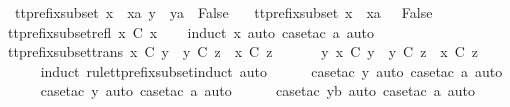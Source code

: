 \ \ {\isachardoublequoteopen}tt{\isacharunderscore}prefix{\isacharunderscore}subset\ {\isacharparenleft}x\ {\isacharhash}\ xa{\isacharparenright}\ {\isacharparenleft}y\ {\isacharhash}\ ya{\isacharparenright}\ {\isacharequal}\ False{\isachardoublequoteclose}\ {\isacharbar}\isanewline
\ \ {\isachardoublequoteopen}tt{\isacharunderscore}prefix{\isacharunderscore}subset\ {\isacharparenleft}x\ {\isacharhash}\ xa{\isacharparenright}\ {\isacharbrackleft}{\isacharbrackright}\ {\isacharequal}\ False{\isachardoublequoteclose}\isanewline
\isanewline
{}\isamarkupfalse%
\ tt{\isacharunderscore}prefix{\isacharunderscore}subset{\isacharunderscore}refl{\isacharcolon}\ {\isachardoublequoteopen}x\ {\isasymlesssim}\isactrlsub C\ x{\isachardoublequoteclose}\isanewline
%
\isadelimproof
\ \ %
\endisadelimproof
%
\isatagproof
{}\isamarkupfalse%
\ {\isacharparenleft}induct\ x{\isacharcomma}\ auto{\isacharcomma}\ case{\isacharunderscore}tac\ a{\isacharcomma}\ auto{\isacharparenright}%
\endisatagproof
{\isafoldproof}%
%
\isadelimproof
\isanewline
%
\endisadelimproof
\isanewline
{}\isamarkupfalse%
\ tt{\isacharunderscore}prefix{\isacharunderscore}subset{\isacharunderscore}trans{\isacharcolon}\ {\isachardoublequoteopen}x\ {\isasymlesssim}\isactrlsub C\ y\ {\isasymLongrightarrow}\ y\ {\isasymlesssim}\isactrlsub C\ z\ {\isasymLongrightarrow}\ x\ {\isasymlesssim}\isactrlsub C\ z{\isachardoublequoteclose}\isanewline
%
\isadelimproof
%
\endisadelimproof
%
\isatagproof
{}\isamarkupfalse%
\ {\isacharminus}\isanewline
\ \ \isamarkupfalse%
\ {\isachardoublequoteopen}{\isasymexists}\ y{\isachardot}\ x\ {\isasymlesssim}\isactrlsub C\ y\ {\isasymand}\ y\ {\isasymlesssim}\isactrlsub C\ z\ {\isasymLongrightarrow}\ x\ {\isasymlesssim}\isactrlsub C\ z{\isachardoublequoteclose}\isanewline
\ \ \ \ \isamarkupfalse%
\ {\isacharparenleft}induct\ rule{\isacharcolon}tt{\isacharunderscore}prefix{\isacharunderscore}subset{\isachardot}induct{\isacharcomma}\ auto{\isacharparenright}\isanewline
\ \ \ \ \isamarkupfalse%
\ {\isacharparenleft}case{\isacharunderscore}tac\ y{\isacharcomma}\ auto{\isacharcomma}\ case{\isacharunderscore}tac\ a{\isacharcomma}\ auto{\isacharparenright}\isanewline
\ \ \ \ \isamarkupfalse%
\ {\isacharparenleft}case{\isacharunderscore}tac\ y{\isacharcomma}\ auto{\isacharcomma}\ case{\isacharunderscore}tac\ a{\isacharcomma}\ auto{\isacharparenright}\isanewline
\ \ \ \ \isamarkupfalse%
\ {\isacharparenleft}case{\isacharunderscore}tac\ yb{\isacharcomma}\ auto{\isacharcomma}\ case{\isacharunderscore}tac\ a{\isacharcomma}\ auto{\isacharparenright}\isanewline
